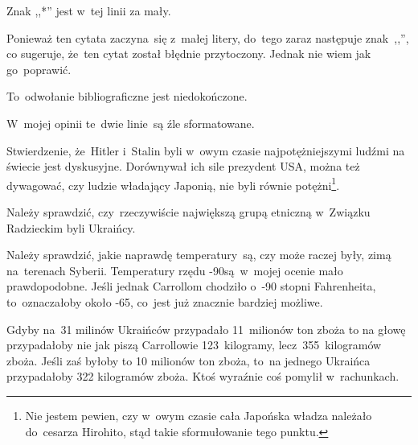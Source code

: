 \documentclass[a4paper,11pt]{article}
\begin{document}
\vspace{\spaceFour}


\start {} Znak ,,*'' jest w~tej linii za mały.

\vspace{\spaceFour}


\start {} Ponieważ ten cytata zaczyna~się z~małej litery,
do~tego zaraz następuje znak~,,\ld'', co sugeruje, że~ten cytat został
błędnie przytoczony. Jednak nie wiem jak go~poprawić.

\vspace{\spaceFour}


\start {} To~odwołanie bibliograficzne jest niedokończone.

\vspace{\spaceFour}


\start {} W~mojej opinii te~dwie linie~są źle
sformatowane.

\vspace{\spaceFour}


\start {} Stwierdzenie, że~Hitler i~Stalin byli w~owym czasie
najpotężniejszymi ludźmi na świecie jest dyskusyjne. Dorównywał ich
sile prezydent USA, można też dywagować, czy ludzie władający Japonią,
nie byli równie potężni\footnote{Nie jestem pewien, czy w~owym czasie
  cała Japońska władza należało do~cesarza Hirohito, stąd takie
  sformułowanie tego punktu.}.

\vspace{\spaceFour}


\start {} Należy sprawdzić, czy~rzeczywiście największą grupą
etniczną w~Związku Radzieckim byli Ukraińcy.

\vspace{\spaceFour}


\start {} Należy sprawdzić, jakie naprawdę temperatury~są, czy
może raczej były, zimą na~terenach Syberii. Temperatury rzędu
-90\textcelsius są~w~mojej ocenie mało prawdopodobne. Jeśli jednak
Carrollom chodziło o~-90 stopni Fahrenheita, to~oznaczałoby około
-65\textcelsius, co~jest już znacznie bardziej możliwe.

\vspace{\spaceFour}


 Gdyby na~31 milinów Ukraińców przypadało 11~milionów ton
zboża to na głowę przypadałoby nie jak piszą Carrollowie
123~kilogramy, lecz~355~kilogramów zboża. Jeśli zaś byłoby to 10
milionów ton zboża, to~na jednego Ukraińca przypadałoby 322 kilogramów
zboża. Ktoś wyraźnie coś pomylił w~rachunkach.
\end{document}
